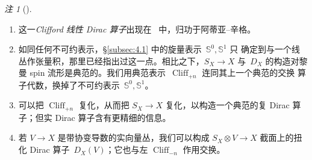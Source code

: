 \documentclass[11pt]{amsart}
\theoremstyle{definition}
\theoremstyle{remark}
\newtheorem{remark}[equation]{注}
\theoremstyle{plain}
\numberwithin{equation}{section}
\renewcommand{\:}{\colon}
\DeclareMathOperator{\pt}{pt}
\DeclareMathOperator{\Spin}{Spin}
\newcommand{\ZZ}{{\mathbb Z}}
\newcommand{\zmod}[1]{\ZZ/#1\ZZ}
\newcommand{\zt}{\zmod2}
\DeclareMathOperator{\Cliff}{Cliff}
\newcommand{\Cnm}{\Cliff_{-n}}
\newcommand{\Cnp}{\Cliff_{+n}}
\renewcommand{\SS}{\mathbb{S}}
\begin{document}
  \begin{remark}[]\label{thm:14}
\ 

 \begin{enumerate}%
 \item 这一\emph{Clifford 线性 Dirac 算子}出现在~\cite[\S
II.7]{LM} 中，归功于阿蒂亚–辛格。

 \item 如同任何不可约表示，\S\ref{subsec:4.1} 中的旋量表示~$\SS^{0},\SS^1$ 只
确定到与一个线丛作张量积，那里已经指出过这一点。相比之下，$S_X\to X$ 与~$D_X$
的构造对黎曼 spin 流形是典范的。我们用典范表示~$\Cnp$ 连同其上一个典范的交换
算子代数，换掉了不可约表示~$\SS^0,\SS^1$。

 \item 可以把 $\Cnp$ 复化，从而把 $S_X\to X$ 复化，以构造一个典范的复 Dirac
算子；但实 Dirac 算子含有更精细的信息。

 \item 若 $V\to X$ 是带协变导数的实向量丛，我们可以构成 $S_X\otimes V\to X$
截面上的扭化 Dirac 算子~$D_X(V)$；它也与左 $\Cnm$ 作用交换。

 \end{enumerate}
  \end{remark}
\end{document}

